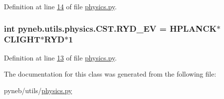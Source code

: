 Definition at line \hyperlink{physics_8py_source_l00014}{14} of file \hyperlink{physics_8py_source}{physics.\-py}.

\hypertarget{classpyneb_1_1utils_1_1physics_1_1_c_s_t_a337f87b4676ea337149e177d81b481e1}{
\subsubsection[{R\-Y\-D\-\_\-\-E\-V}]{\setlength{\rightskip}{0pt plus 5cm}int pyneb.\-utils.\-physics.\-C\-S\-T.\-R\-Y\-D\-\_\-\-E\-V = {\bf H\-P\-L\-A\-N\-C\-K}$\ast${\bf C\-L\-I\-G\-H\-T}$\ast${\bf R\-Y\-D}$\ast$1\hspace{0.3cm}{\ttfamily [static]}}}\label{classpyneb_1_1utils_1_1physics_1_1_c_s_t_a337f87b4676ea337149e177d81b481e1}


Definition at line \hyperlink{physics_8py_source_l00013}{13} of file \hyperlink{physics_8py_source}{physics.\-py}.



The documentation for this class was generated from the following file\-:\begin{DoxyCompactItemize}
\item 
pyneb/utils/\hyperlink{physics_8py}{physics.\-py}\end{DoxyCompactItemize}
